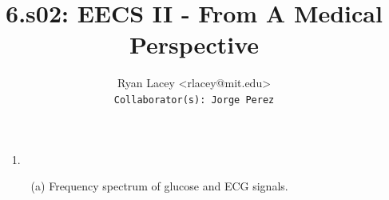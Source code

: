 \documentclass{article}
\begin{document}

\title{6.s02: EECS II - From A Medical Perspective}
\author{
  Ryan Lacey <rlacey@mit.edu>\\
  \footnotesize \texttt{Collaborator(s): Jorge Perez}
}
        
\maketitle
        


\begin{enumerate}
\item[1.]
	\begin{enumerate}
	\item[(a)]
		Frequency spectrum of glucose and ECG signals.
	

\end{enumerate}
\end{enumerate}
\end{document}
